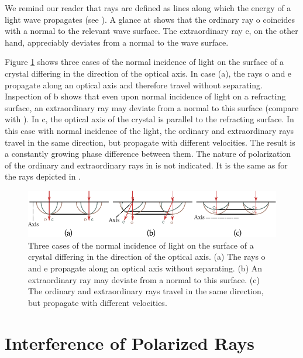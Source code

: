 We remind our reader that rays are defined as lines along which the energy of a light wave
propagates (see ).
A glance at  shows that the ordinary ray o coincides with a normal to the relevant wave
surface.
The extraordinary ray e, on the other hand, appreciably deviates from a normal to the wave surface.

Figure \ref{fig:19_12} shows three cases of the normal incidence of light on the surface of a crystal differing in the direction of the optical
axis.
In case (a), the rays o and e propagate along an optical axis and therefore travel without separating.
Inspection of b shows that even upon normal incidence of light on a refracting surface, an extraordinary ray may deviate from a normal to this surface (compare with ).
In c, the optical axis of the crystal is parallel to the refracting surface.
In this case with normal incidence of the light, the ordinary and extraordinary rays travel in the same direction, but propagate with different velocities.
The result is a constantly growing phase difference between them.
The nature of polarization of the ordinary and extraordinary rays in  is not indicated.
It is the same as for the rays depicted in .

\begin{figure}[t]
	\begin{center}
		\includegraphics[scale=0.95]{figures/ch_19/fig_19_12h.pdf}
        \caption[]{Three cases of the normal incidence of light on the surface of a crystal differing in the direction of the optical axis. (a) The rays o and e propagate along an optical axis without separating. (b) An extraordinary ray may deviate from a normal to this surface. (c) The ordinary and extraordinary rays travel in the same direction, but propagate with different velocities.}
		\label{fig:19_12}
	\end{center}
	\vspace{-0.8cm}
\end{figure}

\section{Interference of Polarized Rays}\label{sec:19_4}

